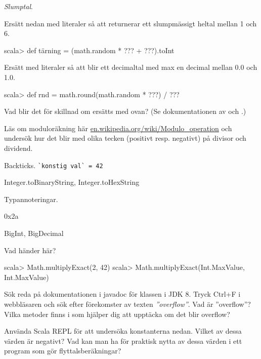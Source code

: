 {{{{{{{\ExtraTasks

\Task \textit{Slumptal}.

\Subtask Ersätt  nedan med literaler så att  returnerar ett slumpmässigt heltal mellan 1 och 6.
\begin{REPLnonum}
scala> def tärning = (math.random * ??? + ???).toInt 
\end{REPLnonum}

\Subtask Ersätt  med literaler så att  blir ett decimaltal med max en decimal mellan 0.0 och 1.0.
\begin{REPLnonum}
scala> def rnd = math.round(math.random * ???) / ??? 
\end{REPLnonum}

\Subtask Vad blir det för skillnad om  ersätts med  ovan? (Se dokumentationen av  och .)

\AdvancedTasks

\Task Läs om moduloräkning här \href{https://en.wikipedia.org/wiki/Modulo\_operation}{en.wikipedia.org/wiki/Modulo\_operation} och undersök hur det blir med olika tecken (positivt resp. negativt) på divisor och dividend.



\Task \TODO Backticks. \texttt{\`{}konstig val\`{} = 42}   %



\Task \TODO Integer.toBinaryString, Integer.toHexString

\Task \TODO Typannoteringar.

\Task \TODO 0x2a

\Task \TODO {}

\Task \TODO BigInt, BigDecimal

\Task \TODO Vad händer här? 
\begin{REPLnonum}
scala> Math.multiplyExact(2, 42)
scala> Math.multiplyExact(Int.MaxValue, Int.MaxValue)
\end{REPLnonum}

\Task Sök reda på dokumentationen i javadoc för klassen  i JDK 8. Tryck Ctrl+F i webbläsaren och sök efter förekomster av texten \textit{''overflow''}. Vad är ''overflow''? Vilka metoder finns i  som hjälper dig att upptäcka om det blir overflow?

\Task Använda Scala REPL för att undersöka konstanterna nedan. Vilket av dessa värden är negativt? Vad kan man ha för praktisk nytta av dessa värden i ett program som gör flyttalsberäkningar?

}}}}}}}
